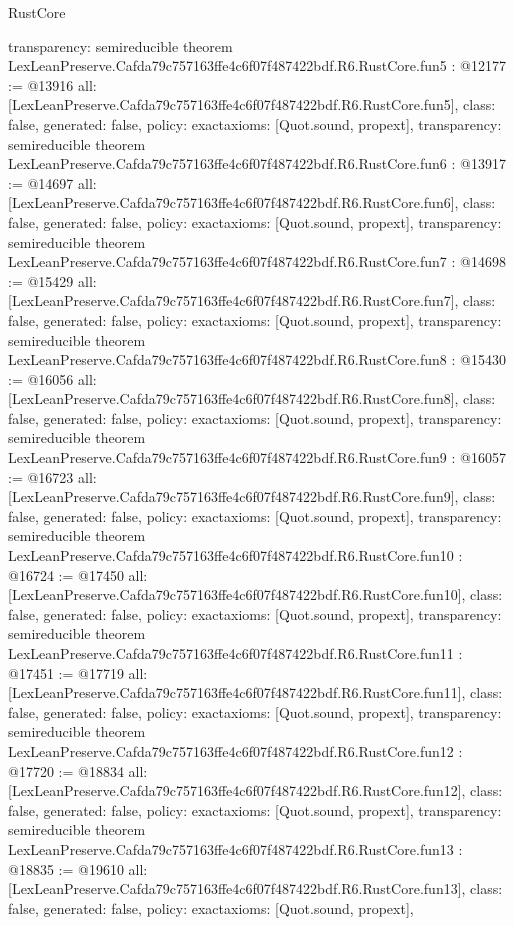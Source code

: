 \begin{lexlean}{RustCore}
\begin{coremodule}
{  transparency: semireducible
}
theorem LexLeanPreserve.Cafda79c757163ffe4c6f07f487422bdf.R6.RustCore.fun5 : @12177 := @13916 {
  all: [LexLeanPreserve.Cafda79c757163ffe4c6f07f487422bdf.R6.RustCore.fun5],
  class: false,
  generated: false,
  policy: exact{axioms: [Quot.sound, propext]},
  transparency: semireducible
}
theorem LexLeanPreserve.Cafda79c757163ffe4c6f07f487422bdf.R6.RustCore.fun6 : @13917 := @14697 {
  all: [LexLeanPreserve.Cafda79c757163ffe4c6f07f487422bdf.R6.RustCore.fun6],
  class: false,
  generated: false,
  policy: exact{axioms: [Quot.sound, propext]},
  transparency: semireducible
}
theorem LexLeanPreserve.Cafda79c757163ffe4c6f07f487422bdf.R6.RustCore.fun7 : @14698 := @15429 {
  all: [LexLeanPreserve.Cafda79c757163ffe4c6f07f487422bdf.R6.RustCore.fun7],
  class: false,
  generated: false,
  policy: exact{axioms: [Quot.sound, propext]},
  transparency: semireducible
}
theorem LexLeanPreserve.Cafda79c757163ffe4c6f07f487422bdf.R6.RustCore.fun8 : @15430 := @16056 {
  all: [LexLeanPreserve.Cafda79c757163ffe4c6f07f487422bdf.R6.RustCore.fun8],
  class: false,
  generated: false,
  policy: exact{axioms: [Quot.sound, propext]},
  transparency: semireducible
}
theorem LexLeanPreserve.Cafda79c757163ffe4c6f07f487422bdf.R6.RustCore.fun9 : @16057 := @16723 {
  all: [LexLeanPreserve.Cafda79c757163ffe4c6f07f487422bdf.R6.RustCore.fun9],
  class: false,
  generated: false,
  policy: exact{axioms: [Quot.sound, propext]},
  transparency: semireducible
}
theorem LexLeanPreserve.Cafda79c757163ffe4c6f07f487422bdf.R6.RustCore.fun10 : @16724 := @17450 {
  all: [LexLeanPreserve.Cafda79c757163ffe4c6f07f487422bdf.R6.RustCore.fun10],
  class: false,
  generated: false,
  policy: exact{axioms: [Quot.sound, propext]},
  transparency: semireducible
}
theorem LexLeanPreserve.Cafda79c757163ffe4c6f07f487422bdf.R6.RustCore.fun11 : @17451 := @17719 {
  all: [LexLeanPreserve.Cafda79c757163ffe4c6f07f487422bdf.R6.RustCore.fun11],
  class: false,
  generated: false,
  policy: exact{axioms: [Quot.sound, propext]},
  transparency: semireducible
}
theorem LexLeanPreserve.Cafda79c757163ffe4c6f07f487422bdf.R6.RustCore.fun12 : @17720 := @18834 {
  all: [LexLeanPreserve.Cafda79c757163ffe4c6f07f487422bdf.R6.RustCore.fun12],
  class: false,
  generated: false,
  policy: exact{axioms: [Quot.sound, propext]},
  transparency: semireducible
}
theorem LexLeanPreserve.Cafda79c757163ffe4c6f07f487422bdf.R6.RustCore.fun13 : @18835 := @19610 {
  all: [LexLeanPreserve.Cafda79c757163ffe4c6f07f487422bdf.R6.RustCore.fun13],
  class: false,
  generated: false,
  policy: exact{axioms: [Quot.sound, propext]},
}
\end{coremodule}
\end{lexlean}
